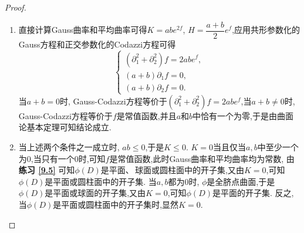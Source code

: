 	\begin{proof}
		\begin{enumerate}[label=(\arabic*)]
			\item 直接计算Gauss曲率和平均曲率可得$K=abe^{2f}$, $H=\dfrac{a+b}{2}e^{f}$,应用共形参数化的Gauss方程和正交参数化的Codazzi方程可得
			$$
			\begin{cases}
				(\partial_{1}^{2}+\partial_{2}^{2})f=2abe^{f},\\
				(a+b)\partial_{1}f=0,\\
				(a+b)\partial_{2}f=0.
			\end{cases}
			$$
			当$a+b=0$时, Gauss-Codazzi方程等价于$(\partial_{1}^{2}+\partial_{2}^{2})f=2abe^{f}$,当$a+b\neq 0$时, Gauss-Codazzi方程等价于$f$是常值函数,并且$a$和$b$中恰有一个为零,于是由曲面论基本定理可知结论成立.
			\item 当上述两个条件之一成立时, $ab\leqslant 0$,于是$K\leqslant 0$. 
            $K=0$当且仅当$a,b$中至少一个为$0$,当只有一个$0$时,可知$f$是常值函数,此时Gauss曲率和平均曲率均为常数,
            由\textbf{练习 \ref{9.5}} 可知$\phi(D)$是平面、\,球面或圆柱面中的开子集,又由$K=0$,可知$\phi(D)$是平面或圆柱面中的开子集.
            当$a,b$都为$0$时, $\phi$是全脐点曲面,于是$\phi(D)$是平面或球面的开子集,又由$K=0$,可知$\phi(D)$是平面的开子集.
            反之,当$\phi(D)$是平面或圆柱面中的开子集时,显然$K=0$.\qedhere
		\end{enumerate}
	\end{proof}

